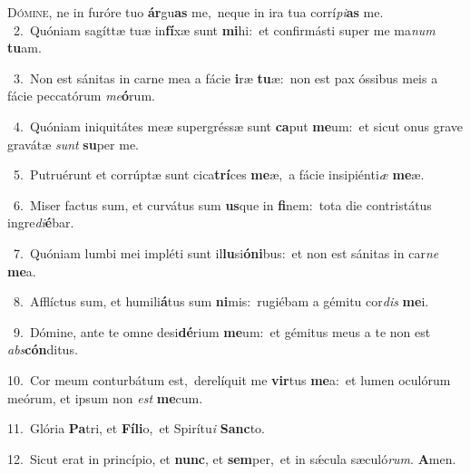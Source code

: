 \lettrine{\initial\textcolor{\initialcolor}{D}}{ómine,} ne in furóre tuo \textbf{ár}\-gu\textbf{as} me,~\star neque in ira tua corrí\-\textit{pi}\-\textbf{as} me.\\
{\numbfont\textcolor{\numbcolor}{~2.}}~Quóniam sagíttæ tuæ in\-\textbf{fí}\-xæ sunt \textbf{mi}\-hi:~\star et confirmásti super me ma\textit{num} \textbf{tu}\-am.\par
{\numbfont\textcolor{\numbcolor}{~3.}}~Non est sánitas in carne mea a fácie \textbf{i}\-ræ \textbf{tu}\-æ:~\star non est pax óssibus meis a fácie peccatórum \textit{me}\-\textbf{ó}rum.\par
{\numbfont\textcolor{\numbcolor}{~4.}}~Quóniam iniquitátes meæ supergréssæ sunt \textbf{ca}\-put \textbf{me}\-um:~\star et sicut onus grave gravátæ \textit{sunt} \textbf{su}\-per me.\par
{\numbfont\textcolor{\numbcolor}{~5.}}~Putruérunt et corrúptæ sunt cica\-\textbf{trí}\-ces \textbf{me}\-æ,~\star a fácie insipiénti\textit{æ} \textbf{me}\-æ.\par
{\numbfont\textcolor{\numbcolor}{~6.}}~Miser factus sum, et curvátus sum \textbf{us}\-que in \textbf{fi}\-nem:~\star tota die contristátus ingre\-\textit{di}\-\textbf{é}bar.\par
{\numbfont\textcolor{\numbcolor}{~7.}}~Quóniam lumbi mei impléti sunt il\-\textbf{lu}\-si\-\textbf{ó}\-\textbf{ni}bus:~\star et non est sánitas in car\textit{ne} \textbf{me}\-a.\par
{\numbfont\textcolor{\numbcolor}{~8.}}~Afflíctus sum, et humili\-\textbf{á}\-tus sum \textbf{ni}\-mis:~\star rugiébam a gémitu cor\textit{dis} \textbf{me}\-i.\par
{\numbfont\textcolor{\numbcolor}{~9.}}~Dómine, ante te omne desi\-\textbf{dé}\-rium \textbf{me}\-um:~\star et gémitus meus a te non est \textit{abs}\-\textbf{cón}ditus.\par
{\numbfont\textcolor{\numbcolor}{10.}}~Cor meum conturbátum est,~\dagger derelíquit me \textbf{vir}\-tus \textbf{me}\-a:~\star et lumen oculórum meórum, et ipsum non \textit{est} \textbf{me}\-cum.\par
{\numbfont\textcolor{\numbcolor}{11.}}~Glória \textbf{Pa}\-tri, et \textbf{Fí}\-\textbf{li}o,~\star et Spirítu\textit{i} \textbf{Sanc}\-to.\par
{\numbfont\textcolor{\numbcolor}{12.}}~Sicut erat in princípio, et \textbf{nunc}\-, et \textbf{sem}\-per,~\star et in sǽcula sæculó\-\textit{rum}\-. \textbf{A}\-men.\par
